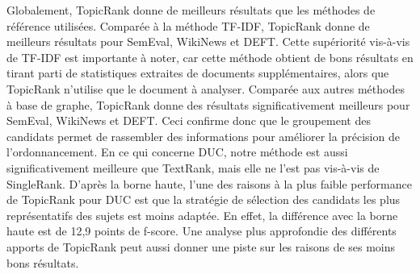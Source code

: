     Globalement, TopicRank donne de meilleurs résultats que les méthodes de
    référence utilisées.
    Comparée à la méthode TF-IDF, TopicRank donne de meilleurs résultats pour
    SemEval, WikiNews et DEFT. Cette supériorité vis-à-vis de TF-IDF est
    importante à noter, car cette méthode obtient de bons résultats en tirant
    parti de statistiques extraites de documents supplémentaires, alors que
    TopicRank n'utilise que le document à analyser. Comparée aux autres méthodes
    à base de graphe, TopicRank donne des résultats significativement meilleurs
    pour SemEval, WikiNews et DEFT. Ceci confirme donc que le groupement des
    candidats permet de rassembler des informations pour améliorer la précision
    de l'ordonnancement. En ce qui concerne DUC, notre méthode est aussi
    significativement meilleure que TextRank, mais elle ne l'est pas vis-à-vis
    de SingleRank. D'après la borne haute, l'une des raisons à la plus faible
    performance de TopicRank pour DUC est que la stratégie de sélection des
    candidats les plus représentatifs des sujets est moins adaptée. En effet, la
    différence avec la borne haute est de 12,9 points de f-score. Une analyse
    plus approfondie des différents apports de TopicRank peut aussi donner une
    piste sur les raisons de ses moins bons résultats.
